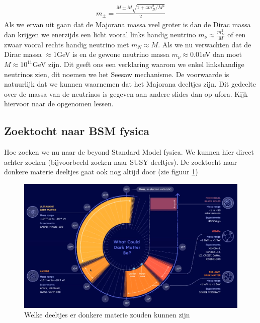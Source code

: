 \documentclass[../main.tex]{subfiles}
\begin{document}
\begin{equation}
    \begin{aligned}
        \label{eq:dirac_majorana_massa_opmenging}
        m_{\pm}=\frac{M \pm M \sqrt{1+4 m_{D}^{2} / M^{2}}}{2}
    \end{aligned}
\end{equation}
Als we ervan uit gaan dat de Majorana massa veel groter is dan de Dirac massa dan krijgen we enerzijds een licht vooral links handig neutrino $m_{\nu} \approx \frac{m_{D}^{2}}{M}$ of een zwaar vooral rechts handig neutrino met $m_{N} \approx M$. Als we nu verwachten dat de Dirac massa $\approx 1$GeV is en de gewone neutrino massa $m_\nu\approx 0.01$eV dan moet $M\approx 10^{11}$GeV zijn. Dit geeft ons een verklaring waarom we enkel linkshandige neutrinos zien, dit noemen we het Seesaw mechanisme. De voorwaarde is natuurlijk dat we kunnen waarnemen dat het Majorana deeltjes zijn. {\color{green} Dit gedeelte over de massa van de neutrinos is gegeven aan andere slides dan op ufora. Kijk hiervoor naar de opgenomen lessen.}

\subsection{Zoektocht naar BSM fysica}%
\label{sub:zoektocht_naar_bsm_fysica}

Hoe zoeken we nu naar de beyond Standard Model fysica. We kunnen hier direct achter zoeken (bijvoorbeeld zoeken naar SUSY deeltjes). De zoektocht naar donkere materie deeltjes gaat ook nog altijd door (zie figuur \ref{fig:physics_beyond_the_standard_model/donkere_materie_mogelijkheden})

\begin{figure}[h]
    \centering
    \includegraphics[width=0.5\linewidth]{physics_beyond_the_standard_model/donkere_materie_mogelijkheden.png}
    \caption{Welke deeltjes er donkere materie zouden kunnen zijn}%
    \label{fig:physics_beyond_the_standard_model/donkere_materie_mogelijkheden}
\end{figure}
\end{document}
